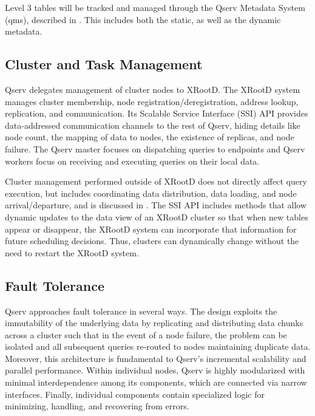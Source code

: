 \documentclass[DM,lsstdraft,toc]{lsstdoc}
\begin{document}
Level 3 tables will be tracked and managed through the Qserv Metadata System
(qms), described in . This includes both the static, as well
as the dynamic metadata.

\subsection{Cluster and Task Management}\label{cluster-and-task-management}

Qserv delegates management of cluster nodes to XRootD. The XRootD system
manages cluster membership, node registration/deregistration, address lookup,
replication, and communication. Its Scalable Service Interface (SSI) API
provides data-addressed communication channels to the rest of Qserv, hiding
details like node count, the mapping of data to nodes, the existence of
replicas, and node failure. The Qserv master focuses on dispatching queries to
endpoints and Qserv workers focus on receiving and executing queries on their
local data.

Cluster management performed outside of XRootD does not directly affect query
execution, but includes coordinating data distribution, data loading, and node
arrival/departure, and is discussed in . The SSI API
includes methods that allow dynamic updates to the data view of an XRootD
cluster so that when new tables appear or disappear, the XRootD system can
incorporate that information for future scheduling decisions. Thus, clusters
can dynamically change without the need to restart the XRootD system.

\subsection{Fault Tolerance}\label{fault-tolerance}

Qserv approaches fault tolerance in several ways. The design exploits the
immutability of the underlying data by replicating and distributing data
chunks across a cluster such that in the event of a node failure, the problem
can be isolated and all subsequent queries re-routed to nodes maintaining
duplicate data. Moreover, this architecture is fundamental to Qserv's
incremental scalability and parallel performance. Within individual nodes,
Qserv is highly modularized with minimal interdependence among its components,
which are connected via narrow interfaces. Finally, individual components
contain specialized logic for minimizing, handling, and recovering from
errors.
\end{document}

